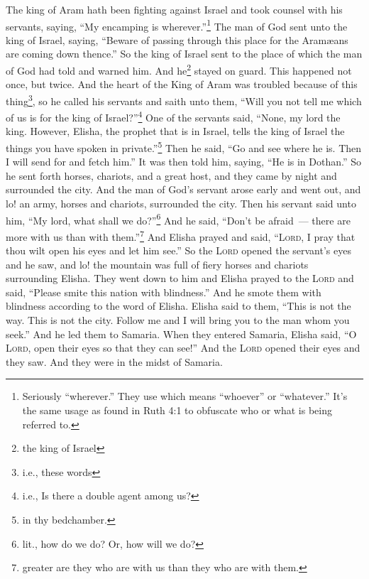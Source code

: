 \begin{inparaenum}
     The king of Aram hath been fighting against Israel and took counsel with his servants, saying, ``My encamping is wherever.''\footnote{Seriously ``wherever.'' They use  which means ``whoever'' or ``whatever.'' It's the same usage as found in Ruth 4:1 to obfuscate who or what is being referred to.}%
     The man of God sent unto the king of Israel, saying, ``Beware of passing through this place for the Aram\ae{}ans are coming down thence.''%
     So the king of Israel sent to the place of which the man of God had told and warned him. And he\footnote{the king of Israel} stayed on guard. This happened not once, but twice.%
     And the heart of the King of Aram was troubled because of this thing\footnote{i.e., these words}, so he called his servants and saith unto them, ``Will you not tell me which of us is for the king of Israel?''\footnote{i.e., Is there a double agent among us?}%
     One of the servants said, ``None, my lord the king. However, Elisha, the prophet that is in Israel, tells the king of Israel the things you have spoken in private.''\footnote{in thy bedchamber.}%
     Then he said, ``Go and see where he is. Then I will send for and fetch him.'' It was then told him, saying, ``He is in Dothan.''%
     So he sent forth horses, chariots, and a great host, and they came by night and surrounded the city.%
     And the man of God's servant arose early and went out, and lo! an army, horses and chariots, surrounded the city. Then his servant said unto him, ``My lord, what shall we do?''\footnote{lit., how do we do? Or, how will we do?}%
     And he said, ``Don't be afraid~--- there are more with us than with them.''\footnote{greater are they who are with us than they who are with them.}%
     And Elisha prayed and said, ``\textsc{Lord}, I pray that thou wilt open his eyes and let him see.'' So the \textsc{Lord} opened the servant's eyes and he saw, and lo! the mountain was full of fiery horses and chariots surrounding Elisha.%
     They went down to him and Elisha prayed to the \textsc{Lord} and said, ``Please smite this nation with blindness.'' And he smote them with blindness according to the word of Elisha.%
     Elisha said to them, ``This is not the way. This is not the city. Follow me and I will bring you to the man whom you seek.'' And he led them to Samaria.%
     When they entered Samaria, Elisha said, ``O \textsc{Lord}, open their eyes so that they can see!'' And the \textsc{Lord} opened their eyes and they saw. And they were in the midst of Samaria.%

\end{inparaenum}
